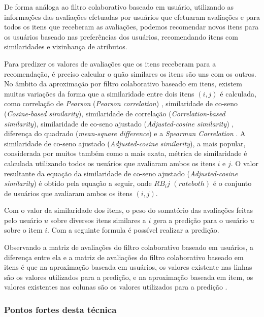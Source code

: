 \documentclass[12pt,
				openright,
				twoside,
				a4paper,
				apter=TITLE,
				section=TITLE,
				subsection=TITLE,
				chapter=TITLE,
				english,
				brazil]{abntex2}
\begin{document}
De forma análoga ao filtro colaborativo baseado em usuário, utilizando as informações das avaliações efetuadas por usuários que efetuaram avaliações e para todos os itens que receberam as avaliações, podemos recomendar novos itens para os usuários baseado nas preferências dos usuários, recomendando itens com similaridades e vizinhança de atributos. 

Para predizer os valores de avaliações que os itens receberam para a recomendação, é preciso calcular o quão similares os itens são uns com os outros. No âmbito da aproximação por filtro colaborativo baseado em itens, existem muitas variações da forma que a similaridade entre dois itens $(i, j)$ é calculada, como correlação de \textit{Pearson} (\textit{Pearson correlation}) \cite{herlocker2000understanding}, similaridade de co-seno (\textit{Cosine-based similarity}), similaridade de correlação (\textit{Correlation-based similarity}), similaridade de co-seno ajustado (\textit{Adjusted-cosine similarity}) \cite{sarwar2001item}, diferença do quadrado (\textit{mean-square difference}) \cite{shardanand1995social} e a \textit{Spearman Correlation} \cite{massa2004using}. A similaridade de co-seno ajustado (\textit{Adjusted-cosine similarity}), a mais popular, considerada por muitos também como a mais exata, métrica de similaridade é calculada utilizando todos os usuários que avaliaram ambos os itens $i$ e $j$. O valor resultante da equação da similaridade de co-seno ajustado (\textit{Adjusted-cosine similarity}) é obtido pela equação a seguir, onde $RB_ij$ $(rate both)$ é o conjunto de usuários que avaliaram ambos os itens $(i, j)$.


Com o valor da similaridade dos itens, o peso do somatório das avaliações feitas pelo usuário $u$ sobre diversos itens similares a $i$ gera a predição para o usuário $u$ sobre o item $i$. Com a seguinte formula é possível realizar a predição.


Observando a matriz de avaliações do filtro colaborativo baseado em usuários, a diferença entre ela e a matriz de avaliações do filtro colaborativo baseado em itens é que na aproximação baseada em usuários, os valores existente nas linhas são os valores utilizados para a predição, e na aproximação baseada em item, os valores existentes nas colunas são os valores utilizados para a predição \cite{sarwar2001item}. 


\subsubsection{Pontos fortes desta técnica}
\end{document}
